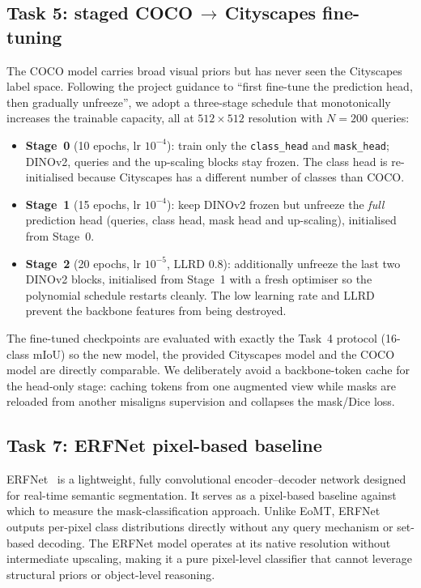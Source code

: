 \subsection{Task 5: staged COCO\,$\rightarrow$\,Cityscapes fine-tuning}
\label{sec:method-task5}
The COCO model carries broad visual priors but has never seen the Cityscapes
label space. Following the project guidance to ``first fine-tune the
prediction head, then gradually unfreeze'', we adopt a three-stage schedule
that monotonically increases the trainable capacity, all at $512{\times}512$
resolution with $N{=}200$ queries:
\begin{itemize}\setlength\itemsep{1pt}
  \item \textbf{Stage~0} (10 epochs, lr $10^{-4}$): train only the
  \texttt{class\_head} and \texttt{mask\_head}; DINOv2, queries and the
  up-scaling blocks stay frozen. The class head is re-initialised because
  Cityscapes has a different number of classes than COCO.
  \item \textbf{Stage~1} (15 epochs, lr $10^{-4}$): keep DINOv2 frozen but
  unfreeze the \emph{full} prediction head (queries, class head, mask head and
  up-scaling), initialised from Stage~0.
  \item \textbf{Stage~2} (20 epochs, lr $10^{-5}$, LLRD $0.8$): additionally
  unfreeze the last two DINOv2 blocks, initialised from Stage~1 with a fresh
  optimiser so the polynomial schedule restarts cleanly. The low learning rate
  and LLRD prevent the backbone features from being destroyed.
\end{itemize}
The fine-tuned checkpoints are evaluated with exactly the Task~4 protocol
(16-class mIoU) so the new model, the provided Cityscapes model and the COCO
model are directly comparable. We deliberately avoid a backbone-token cache
for the head-only stage: caching tokens from one augmented view while masks
are reloaded from another misaligns supervision and collapses the mask/Dice
loss.

\subsection{Task 7: ERFNet pixel-based baseline}
\label{sec:method-task7}
ERFNet~\cite{erfnet} is a lightweight, fully convolutional encoder--decoder
network designed for real-time semantic segmentation. It serves as a pixel-based
baseline against which to measure the mask-classification approach. Unlike EoMT,
ERFNet outputs per-pixel class distributions directly without any query
mechanism or set-based decoding. The ERFNet model operates at its native
resolution without intermediate upscaling, making it a pure pixel-level
classifier that cannot leverage structural priors or object-level reasoning.

